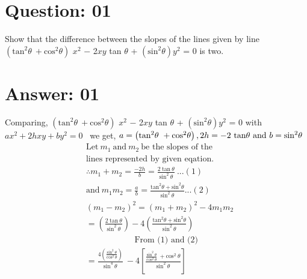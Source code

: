 \documentclass[17pt]{extarticle}
\begin{document}
\noindent
\begin{fleqn} 


\section{Question: 01}
Show that the difference between the slopes of the lines given by line $\left(\text{tan}^2\theta \ + \text{cos}^2\theta \right)$ $x^2$ $-$ 2$xy$ tan $\theta$ + $\left(\text{sin}^2\theta\right) y^2 $ = 0  is two.
 

\section{Answer: 01}
Comparing, $\left(\text{tan}^2\theta \ + \text{cos}^2\theta \right)$ $x^2$ $-$ 2$xy$ tan $\theta$ + $\left(\text{sin}^2\theta\right) y^2 $ = 0 with $ax^2 + 2hxy +  by^2 = 0 $  \ we get, $a = \left(\text{tan}^2\theta \ + \text{cos}^2\theta \right),\\ 2h = - 2\ \text {tan}\theta \  \text{and}\ b = \text{sin}^2\theta $
\vspace*{-3mm}
\begin{equation} \nonumber
\begin{alignedat}{4}
& \text {Let} \ m_1 \ \text{and}\ m_2\ \text {be the slopes of the}\\ 
& \text {lines represented by given eqation.}  \\
& \therefore m_1 + m_2 = \frac{-2h}{b} = \frac{2\ \text{tan}\ \theta}{\text {sin}^2\ \theta}\ ...(1)\\  
& \text {and} \ m_1 m_2 = \frac{a}{b} = \frac{\text{tan}^2 \theta + \text{sin}^2 \theta }{\text {sin}^2\ \theta} ...(2) \\ 
& \left(m_1 - m_2 \right)^2 = \left(m_1 + m_2 \right)^2 - 4m_1m_2 \\
& =\left( \frac{2\ \text{tan}\ \theta}{\text {sin}^2\ \theta}\right)-4\left( \frac{\text{tan}^2 \theta + \text{sin}^2 \theta }{\text {sin}^2\ \theta} \right) \\ 
& \ \ \ \ \ \ \ \ \ \ \ \ \ \ \ \ \ \ \ \ \ \ \ \ \ \  \text {From (1) and (2)}  \\
& = \frac{ 4\left( \frac{\text {sin}^2\ \theta}{\text {cos}^2\ \theta}\right) }{\text {sin}^4\ \theta}\ - 4\left[ \frac{ \frac{\text {sin}^2\ \theta}{\text {cos}^2\ \theta}\ + \text {cos}^2\ \theta}{\text {sin}^2\ \theta} \right]

\end{alignedat}
\end{equation}
\end{fleqn}
\end{document}
